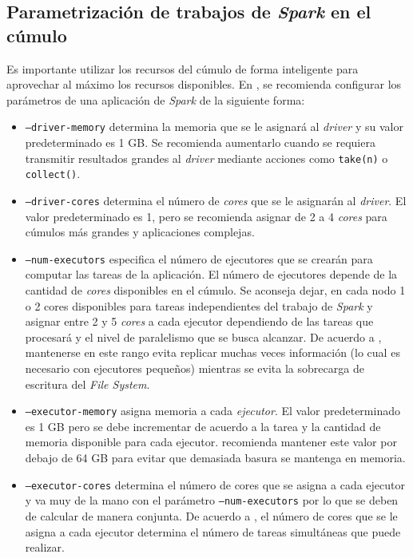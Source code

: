 \subsection{Parametrización de trabajos de \textit{Spark} en el cúmulo}
\label{section:parametrizacion_de_trabajos_spark}

Es importante utilizar los recursos del cúmulo de forma inteligente para aprovechar al máximo los recursos disponibles. En \cite{sparkconfuds}, se recomienda configurar los parámetros de una aplicación de \textit{Spark} de la siguiente forma:

\begin{itemize}
	\item \texttt{--driver-memory} determina la memoria que se le asignará al \textit{driver} y su valor predeterminado es 1 GB. Se recomienda aumentarlo cuando se requiera transmitir resultados grandes al \textit{driver} mediante acciones como \texttt{take(n)} o \texttt{collect()}.
	\item \texttt{--driver-cores} determina el número de \textit{cores} que se le asignarán al \textit{driver}. El valor predeterminado es 1, pero se recomienda asignar de 2 a 4 \textit{cores} para cúmulos más grandes y aplicaciones complejas. 
	\item \texttt{--num-executors} especifica el número de ejecutores que se crearán para computar las tareas de la aplicación. El número de ejecutores depende de la cantidad de \textit{cores} disponibles en el cúmulo. Se aconseja dejar, en cada nodo 1 o 2 cores disponibles para tareas independientes del trabajo de \textit{Spark} y asignar entre 2 y 5 \textit{cores} a cada ejecutor dependiendo de las tareas que procesará y el nivel de paralelismo que se busca alcanzar. De acuerdo a \cite{sparkconfcloudera}, mantenerse en este rango evita replicar muchas veces información (lo cual es necesario con ejecutores pequeños) mientras se evita la sobrecarga de escritura del \textit{File System}.
	\item \texttt{--executor-memory} asigna memoria a cada \textit{ejecutor}. El valor predeterminado es 1 GB pero se debe incrementar de acuerdo a la tarea y la cantidad de memoria disponible para cada ejecutor. \cite{sparkconfcloudera} recomienda mantener este valor por debajo de 64 GB para evitar que demasiada basura se mantenga en memoria.
	\item \texttt{--executor-cores} determina el número de cores que se asigna a cada ejecutor y va muy de la mano con el parámetro \texttt{--num-executors} por lo que se deben de calcular de manera conjunta. De acuerdo a \cite{sparkconfcloudera}, el número de cores que se le asigna a cada ejecutor determina el número de tareas simultáneas que puede realizar.
\end{itemize}

